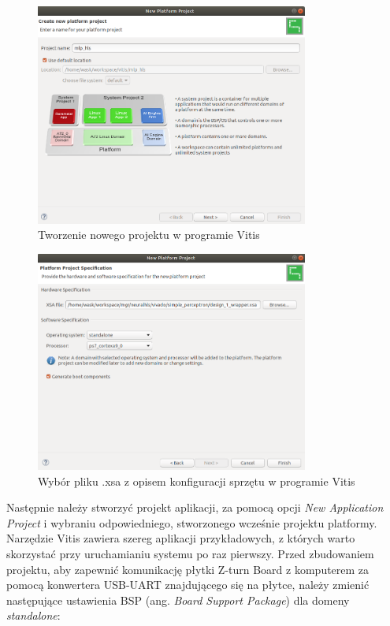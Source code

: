 \begin{figure}[!h]
  \centering
  \includegraphics[width=0.8\textwidth]{img/new-vitis-project1.png}
  \caption{Tworzenie nowego projektu w programie Vitis}
  \label{new-vitis-project1}
\end{figure}


\begin{figure}[!h]
  \centering
  \includegraphics[width=0.8\textwidth]{img/new-vitis-project2.png}
  \caption{Wybór pliku .xsa z opisem konfiguracji sprzętu w programie Vitis}
  \label{new-vitis-project2}
\end{figure}

Następnie należy stworzyć projekt aplikacji, za pomocą opcji \emph{New Application Project} i wybraniu odpowiedniego, 
stworzonego wcześnie projektu platformy. Narzędzie Vitis zawiera szereg aplikacji przykładowych, z których warto 
skorzystać przy uruchamianiu systemu po raz pierwszy. Przed zbudowaniem projektu, aby zapewnić komunikację płytki 
Z-turn Board z komputerem za pomocą konwertera USB-UART znajdującego się na płytce, należy zmienić następujące 
ustawienia BSP (ang. \emph{Board Support Package}) dla domeny \emph{standalone}:

